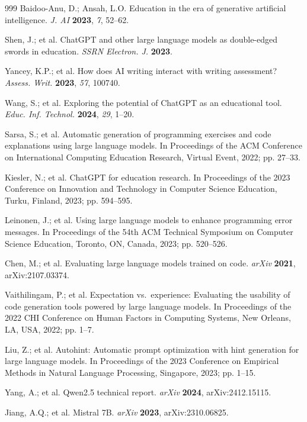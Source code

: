 \documentclass[applsci,article,submit,pdftex,moreauthors]{Definitions/mdpi}
\begin{document}
\begin{thebibliography}{999}
Baidoo-Anu, D.; Ansah, L.O. Education in the era of generative artificial intelligence. \textit{J. AI} \textbf{2023}, \textit{7}, 52--62.

Shen, J.; et al. ChatGPT and other large language models as double-edged swords in education. \textit{SSRN Electron. J.} \textbf{2023}.

Yancey, K.P.; et al. How does AI writing interact with writing assessment? \textit{Assess. Writ.} \textbf{2023}, \textit{57}, 100740.

Wang, S.; et al. Exploring the potential of ChatGPT as an educational tool. \textit{Educ. Inf. Technol.} \textbf{2024}, \textit{29}, 1--20.

Sarsa, S.; et al. Automatic generation of programming exercises and code explanations using large language models. In Proceedings of the ACM Conference on International Computing Education Research, Virtual Event, 2022; pp. 27--33.

Kiesler, N.; et al. ChatGPT for education research. In Proceedings of the 2023 Conference on Innovation and Technology in Computer Science Education, Turku, Finland, 2023; pp. 594--595.

Leinonen, J.; et al. Using large language models to enhance programming error messages. In Proceedings of the 54th ACM Technical Symposium on Computer Science Education, Toronto, ON, Canada, 2023; pp. 520--526.

Chen, M.; et al. Evaluating large language models trained on code. \textit{arXiv} \textbf{2021}, arXiv:2107.03374.

Vaithilingam, P.; et al. Expectation vs.\ experience: Evaluating the usability of code generation tools powered by large language models. In Proceedings of the 2022 CHI Conference on Human Factors in Computing Systems, New Orleans, LA, USA, 2022; pp. 1--7.

Liu, Z.; et al. Autohint: Automatic prompt optimization with hint generation for large language models. In Proceedings of the 2023 Conference on Empirical Methods in Natural Language Processing, Singapore, 2023; pp. 1--15.

Yang, A.; et al. Qwen2.5 technical report. \textit{arXiv} \textbf{2024}, arXiv:2412.15115.

Jiang, A.Q.; et al. Mistral 7B. \textit{arXiv} \textbf{2023}, arXiv:2310.06825.


\end{thebibliography}
\end{document}
